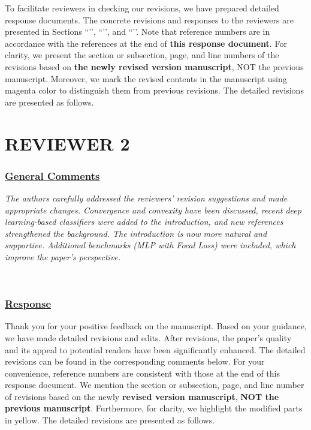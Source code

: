 \documentclass[journal,12pn, onecolumn]{IEEEtran}
\begin{document}
{\color{black}
To facilitate reviewers in checking our revisions, we have prepared detailed response documents. The concrete revisions and responses to the reviewers are presented in Sections ``’’, ``’’, and ``’’. Note that reference numbers are in accordance with the references at the end of \textbf{this response document}. For clarity, we present the section or subsection, page, and line numbers of the revisions based on \textbf{the newly revised version manuscript}, NOT the previous manuscript. Moreover, we mark the revised contents in the manuscript using {\color{magenta} magenta color} to distinguish them from previous revisions. The detailed revisions are presented as follows.
}\\


\newpage


{\color{black}
\section*{\textbf{REVIEWER 2}}\label{rev2}}

{\color{black}
\subsubsection*{\underline{General Comments}}
\emph{The authors carefully addressed the reviewers' revision suggestions and made appropriate changes. Convergence and convexity have been discussed, recent deep learning-based classifiers were added to the introduction, and new references strengthened the background. The introduction is now more natural and supportive. Additional benchmarks (MLP with Focal Loss) were included, which improve the paper's perspective.}
}\\

{\color{black}
\subsubsection*{\textbf{\underline{Response}}}
Thank you for your positive feedback on the manuscript. Based on your guidance, we have made detailed revisions and edits. After revisions, the paper's quality and its appeal to potential readers have been significantly enhanced. The detailed revisions can be found in the corresponding comments below. For your convenience, reference numbers are consistent with those at the end of this response document. We mention the section or subsection, page, and line number of revisions based on the newly \textbf{revised version manuscript}, \textbf{NOT the previous manuscript}. Furthermore, for clarity, we highlight the modified parts in {\color{orange} yellow}. The detailed revisions are presented as follows.
}\\
\end{document}
